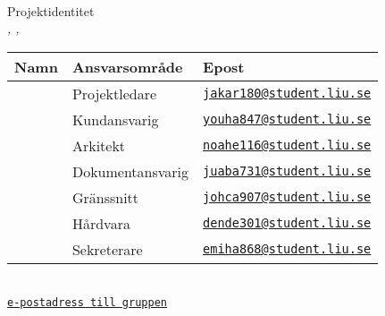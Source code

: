 \documentclass[kravspec/krav.tex]{subfiles}
\newenvironment{projektidentitet}{%
{\ }\vspace{30mm}
\renewcommand{\arraystretch}{2}
\begin{center}
  {\huge Projektidentitet\\[1ex]}
  \textsl{\VARgruppnummer, \LIPSdatum, \VARprojekttitel}\\[1cm]
    \begin{tabular}{lp{60mm}l}
      \hline
      \textbf{Namn} &
      \textbf{Ansvarsområde} &
      \textbf{Epost} \\
	\hline
      }%
      {%
      \hline
    \end{tabular}
\end{center}
}
\newcommand{\gruppmedlem}[3]{{#1} & {#2} & {#3} \\}
\begin{document}
\thispagestyle{empty}

\begin{projektidentitet}
\gruppmedlem{\VARprojektledare}{Projektledare}{\href{mailto:jakar180@student.liu.se}{\texttt{jakar180@student.liu.se}}}
\gruppmedlem{\VARkundansvarig}{Kundansvarig}{\href{mailto:youha847@student.liu.se}{\texttt{youha847@student.liu.se}}}
\gruppmedlem{\VARarkitekt}{Arkitekt}{\href{mailto:noahe116@student.liu.se}{\texttt{noahe116@student.liu.se}}}
\gruppmedlem{\VARdokumentansvarig}{Dokumentansvarig}{\href{mailto:juaba731@student.liu.se}{\texttt{juaba731@student.liu.se}}}

\gruppmedlem{\VARgranssnitt}{Gränssnitt}{\href{mailto:johca907@student.liu.se}{\texttt{johca907@student.liu.se}}}
\gruppmedlem{\VARhardware}{Hårdvara}{\href{mailto:dende301@student.liu.se}{\texttt{dende301@student.liu.se}}}
\gruppmedlem{\VARsekreterare}{Sekreterare}{\href{mailto:emiha868@student.liu.se}{\texttt{emiha868@student.liu.se}}}
\end{projektidentitet}\\[1cm]
\href{mailto:jakar180@student.liu.se, youha847@student.liu.se, noahe116@student.liu, juaba731@student.liu.se, johca907@student.liu.se, dende301@student.liu.se,emiha868@student.liu.se}\texttt{e-postadress till gruppen}

\newpage
\end{document}
